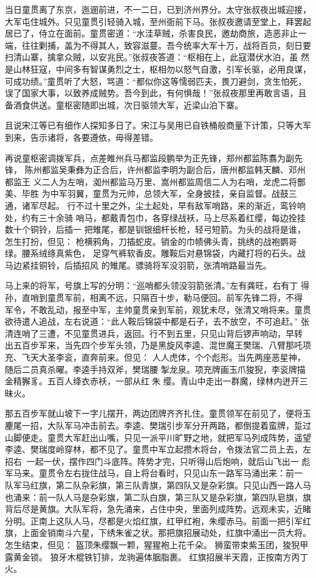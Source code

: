 当日童贯离了东京，迤逦前进，不一二日，已到济州界分。太守张叔夜出城迎接，
大军屯住城外。只见童贯引轻骑入城，至州衙前下马。张叔夜邀请至堂上，拜罢起
居已了，侍立在面前。童贯密道：“水洼草贼，杀害良民，邀劫商旅，造恶非止一
端，往往剿捕，盖为不得其人，致容滋蔓。吾今统率大军十万，战将百员，刻日要
扫清山寨，擒拿众贼，以安兆民。”张叔夜答道：“枢相在上，此寇潜伏水泊，虽
然是山林狂寇，中间多有智谋勇烈之士，枢相勿以怒气自激，引军长驱，必用良谋，
可成功绩。”童贯听了大怒，骂道：“都似你这等懦弱匹夫，畏刀避剑，贪生怕死，
误了国家大事，以致养成贼势。吾今到此，有何惧哉！”张叔夜那里再敢言语，且
备酒食供送。童枢密随即出城，次日驱领大军，近梁山泊下寨。

且说宋江等已有细作人探知多日了。宋江与吴用已自铁桶般商量下计策，只等大军
到来，告示诸将，各要遵依，毋得差错。

再说童枢密调拨军兵，点差睢州兵马都监段鹏举为正先锋，郑州都监陈翥为副先锋，
陈州都监吴秉彝为正合后，许州都监李明为副合后，唐州都监韩天麟、邓州都监王
义二人为左哨，洳州都监马万里、嵩州都监周信二人为右哨，龙虎二将酆美、毕胜
为中军羽翼，童贯为元帅，总领大军，全身披挂，亲自监督。战鼓三通，诸军尽起。
行不过十里之外，尘土起处，早有敌军哨路，来的渐近，鸾铃响处，约有三十余骑
哨马，都戴青包巾，各穿绿战袄，马上尽系着红缨，每边拴挂数十个铜铃，后插一
把雉尾，都是钏银细杆长枪，轻弓短箭。为头的战将是谁，怎生打扮，但见：
枪横鸦角，刀插蛇皮。销金的巾帻佛头青，挑绣的战袍鹦哥绿。腰系绒绦真紫色，
足穿气裤软香皮。雕鞍后对悬锦袋，内藏打将的石头。战马边紧挂铜铃，后插招风
的雉尾。骠骑将军没羽箭，张清哨路最当先。

马上来的将军，号旗上写的分明：“巡哨都头领没羽箭张清。”左有龚旺，右有丁
得孙，直哨到童贯军前，相离不远，只隔百十步，勒马便回。前军先锋二将，不得
军令，不敢乱动，报至中军，主帅童贯亲到军前，观犹未尽，张清又哨将来。童贯
欲待遣人追战，左右说道：“此人鞍后锦袋中都是石子，去不放空，不可追赶。”
张清连哨了三遭，不见童贯进兵，返回。行不到五里，只见山背后锣声响动，早转
出五百步军来，当先四个步军头领，乃是黑旋风李逵、混世魔王樊瑞、八臂那吒项
充、飞天大圣李衮，直奔前来。但见：
人人虎体，个个彪形。当先两座恶星神，随后二员真杀曜。李逵手持双斧，樊瑞腰
掣龙泉。项充牌画玉爪狻猊，李衮牌描金精獬豸。五百人绛衣赤袄，一部从红朱
缨。青山中走出一群魔，绿林内迸开三昧火。

那五百步军就山坡下一字儿摆开，两边团牌齐齐扎住。童贯领军在前见了，便将玉
麈尾一招，大队军马冲击前去。李逵、樊瑞引步军分开两路，都倒提着蛮牌，踅过
山脚便走。童贯大军赶出山嘴，只见一派平川旷野之地，就把军马列成阵势，遥望
李逵、樊瑞度岭穿林，都不见了。童贯中军立起攒木将台，令拨法官二员上去，左
招右，一起一伏，摆作四门斗底阵。阵势才完，只听得山后炮响，就后山飞出一
彪军马来。童贯令左右拢住战马，自上将台看时，只见山东一路军马涌出来：前一
队军马红旗，第二队杂彩旗，第三队青旗，第四队又是杂彩旗。只见山西一路人马
也涌来：前一队人马是杂彩旗，第二队白旗，第三队又是杂彩旗，第四队皂旗，旗
背后尽是黄旗。大队军将，急先涌来，占住中央，里面列成阵势。远观未实，近睹
分明。正南上这队人马，尽都是火焰红旗，红甲红袍，朱缨赤马。前面一把引军红
旗，上面金销南斗六星，下绣朱雀之状。那把旗招展动处，红旗中涌出一员大将。
怎生结束，但见：
盔顶朱缨飘一颗，猩猩袍上花千朵。
狮蛮带束紫玉团，狻猊甲露黄金锁。
狼牙木棍铁钉排，龙驹遍体胭脂裹。
红旗招展半天霞，正按南方丙丁火。

